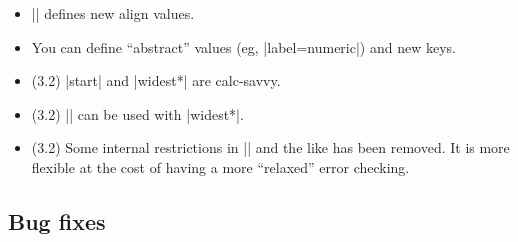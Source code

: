 \documentclass[a4paper]{ltxguide}
\begin{document}
\begin{enumerate}[leftmargin=*]
\begin{enumerate}[leftmargin=\parindent]
\begin{enumerate}[labelindent=\parindent,|\allowbreak
| leftmargin=*,|\allowbreak| label=\Roman*.,|\allowbreak
| widest=III,|\allowbreak| align=left]
\begin{enumerate}[label=\fbox{\arabic*}]
\begin{itemize}
\item|\SetLabelAlign| defines new align values.

\item You can define ``abstract'' values (eg, |label=numeric|) and
new keys.
\end{itemize}

\begin{itemize}
\item (3.2) |start| and |widest*| are \textsf{calc}-savvy.
\item (3.2) |\value| can be used with |widest*|.
\item (3.2) Some internal restrictions in |\arabic| and the like
has been removed.  It is more flexible at the cost of having a more
``relaxed'' error checking.
\end{itemize}
\subsection{Bug fixes}


\end{enumerate}
\end{enumerate}
\end{enumerate}
\end{enumerate}
\end{document}
